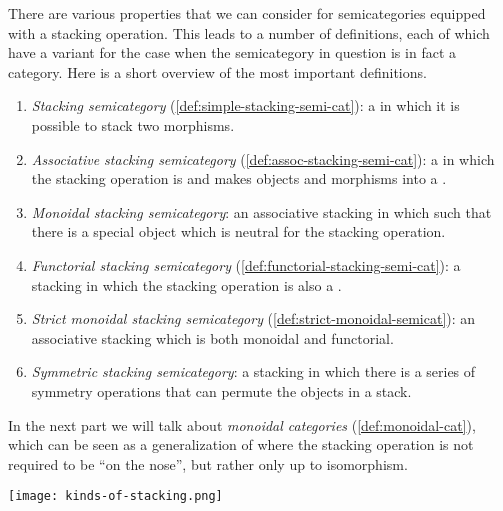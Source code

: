 There are various properties that we can consider for semicategories equipped with a stacking operation.
This leads to a number of definitions, each of which have a variant for the case when the semicategory in question is in fact a category.
Here is a short overview of the most important definitions.
%
\begin{enumerate}
    \item \emph{Stacking semicategory} (\cref{def:simple-stacking-semi-cat}): a  in which it is possible to stack two morphisms.
    \item \emph{Associative stacking semicategory} (\cref{def:assoc-stacking-semi-cat}): a  in which the stacking operation is  and makes objects and morphisms into a .
    \item \emph{Monoidal stacking semicategory}: an associative stacking  in which such that there is a special object which is neutral for the stacking operation.
    \item \emph{Functorial stacking semicategory} (\cref{def:functorial-stacking-semi-cat}): a stacking  in which the stacking operation is also a .
    \item \emph{Strict monoidal stacking semicategory} (\cref{def:strict-monoidal-semicat}): an associative stacking  which is both monoidal and functorial.
    \item \emph{Symmetric stacking semicategory}: a stacking  in which there is a series of symmetry operations that can permute the objects in a stack.
\end{enumerate}
%
In the next part we will talk about \emph{monoidal categories} (\cref{def:monoidal-cat}), which can be seen as a generalization of   where the stacking operation is not required to be  ``on the nose'', but rather only up to isomorphism.


\begin{center}
    \texttt{[image: kinds-of-stacking.png]}
\end{center}

